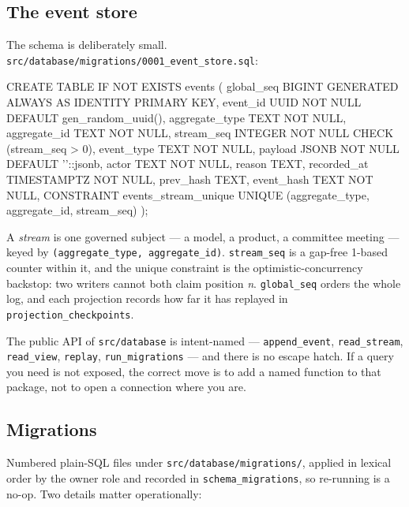 \documentclass[11pt]{article}
\begin{document}
\subsection{The event store}

The schema is deliberately small. \texttt{src/database/migrations/0001\_event\_store.sql}:

\begin{code}
CREATE TABLE IF NOT EXISTS events (
    global_seq     BIGINT GENERATED ALWAYS AS IDENTITY PRIMARY KEY,
    event_id       UUID NOT NULL DEFAULT gen_random_uuid(),
    aggregate_type TEXT NOT NULL,
    aggregate_id   TEXT NOT NULL,
    stream_seq     INTEGER NOT NULL CHECK (stream_seq > 0),
    event_type     TEXT NOT NULL,
    payload        JSONB NOT NULL DEFAULT '{}'::jsonb,
    actor          TEXT NOT NULL,
    reason         TEXT,
    recorded_at    TIMESTAMPTZ NOT NULL,
    prev_hash      TEXT,
    event_hash     TEXT NOT NULL,
    CONSTRAINT events_stream_unique UNIQUE (aggregate_type, aggregate_id, stream_seq)
);
\end{code}

A \emph{stream} is one governed subject --- a model, a product, a committee meeting ---
keyed by \texttt{(aggregate\_type, aggregate\_id)}. \texttt{stream\_seq} is a gap-free
1-based counter within it, and the unique constraint is the optimistic-concurrency
backstop: two writers cannot both claim position \emph{n}. \texttt{global\_seq} orders the
whole log, and each projection records how far it has replayed in
\texttt{projection\_checkpoints}.

The public API of \texttt{src/database} is intent-named --- \texttt{append\_event},
\texttt{read\_stream}, \texttt{read\_view}, \texttt{replay}, \texttt{run\_migrations} ---
and there is no escape hatch. If a query you need is not exposed, the correct move is to
add a named function to that package, not to open a connection where you are.

\subsection{Migrations}

Numbered plain-SQL files under \texttt{src/database/migrations/}, applied in lexical order
by the owner role and recorded in \texttt{schema\_migrations}, so re-running is a no-op.
Two details matter operationally:
\end{document}
